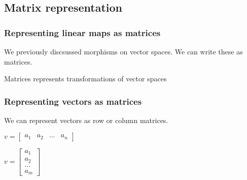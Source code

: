 
\subsection{Matrix representation}

\subsubsection{Representing linear maps as matrices}

We previously discsussed morphisms on vector spaces. We can write these as matrices.

Matrices represents transformations of vector spaces

\subsubsection{Representing vectors as matrices}

We can represent vectors as row or column matrices.

$v=\begin{bmatrix}a_{1} & a_{2}&...&a_{n}\end{bmatrix}$

$v=\begin{bmatrix}a_{1}\\a_{2}\\...\\a_{m}\end{bmatrix}$

